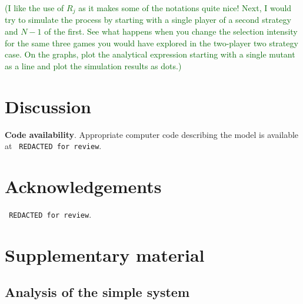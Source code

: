 \documentclass{article}
\newcommand{\cha}[1]{\textcolor{darkgreen}{(#1)}}
\begin{document}
\cha{I like the use of $R_j$ as it makes some of the notations quite nice! Next, I would try to simulate the process by starting with a single player of a second strategy and $N-1$ of the first. See what happens when you change the selection intensity for the same three games you would have explored in the two-player two strategy case. On the graphs, plot the analytical expression starting with a single mutant as a line and plot the simulation results as dots.}





\section{Discussion}


\textbf{Code availability}.
Appropriate computer code describing the model is available at 
\texttt{ REDACTED for review}.%

\section{Acknowledgements}
\texttt{ REDACTED for review}.%





\renewcommand{\theequation}{SI.\arabic{equation}}
\setcounter{equation}{0}

\renewcommand{\thefigure}{SI.\arabic{figure}}
\setcounter{figure}{0}

\section{Supplementary material}


\subsection{Analysis of the simple system}
\end{document}
